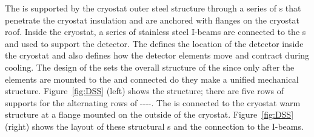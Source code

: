 The  is supported by the
cryostat outer steel structure through a series of \fdth{}s that penetrate %
the cryostat insulation and are anchored with flanges on
the cryostat roof. 
Inside the cryostat, a series of stainless steel I-beams are connected to the \fdth{}s and used to support the
detector. 
The  defines the location of the detector inside the cryostat and also defines  how the detector elements move and contract %
during cooling. 
The design of the  %
sets the overall
structure %
of the  since %
only after the elements are mounted to the  and connected do they make a unified mechanical structure. 
Figure~\ref{fig:DSS} (left) shows the  structure; there are
five rows of supports for the alternating rows of
----.  
The  is connected to the cryostat warm structure at a flange mounted on the outside of the cryostat.  
Figure~\ref{fig:DSS} (right)
shows the layout of these structural \fdth{}s and the connection to the I-beams.

